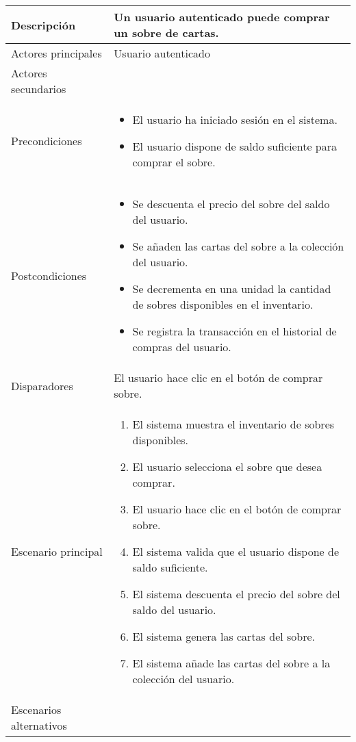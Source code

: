 \begin{longtable}{
    >{\columncolor{lightgreen!20}}p{4cm}
    p{12cm}
    }
    \midrule
    Descripción & Un usuario autenticado puede comprar un sobre de cartas. \\
    \midrule
    Actores principales & Usuario autenticado \\
    \midrule
    Actores secundarios &  \\
    \midrule
    Precondiciones & \begin{itemize}[nosep,leftmargin=*]
        \item El usuario ha iniciado sesión en el sistema.
        \item El usuario dispone de saldo suficiente para comprar el sobre.
    \end{itemize} \\
    \midrule
    Postcondiciones & \begin{itemize}[nosep,leftmargin=*]
        \item Se descuenta el precio del sobre del saldo del usuario.
        \item Se añaden las cartas del sobre a la colección del usuario.
        \item Se decrementa en una unidad la cantidad de sobres disponibles en el inventario.
        \item Se registra la transacción en el historial de compras del usuario.
    \end{itemize} \\
    \midrule
    Disparadores & El usuario hace clic en el botón de comprar sobre. \\
    \midrule
    Escenario principal & \begin{enumerate}[nosep,leftmargin=*]
        \item El sistema muestra el inventario de sobres disponibles.
        \item El usuario selecciona el sobre que desea comprar.
        \item El usuario hace clic en el botón de comprar sobre.
        \item El sistema valida que el usuario dispone de saldo suficiente.
        \item El sistema descuenta el precio del sobre del saldo del usuario.
        \item El sistema genera las cartas del sobre.
        \item El sistema añade las cartas del sobre a la colección del usuario.
    \end{enumerate} \\
    \midrule
    Escenarios alternativos & 
    \begin{itemize}[nosep,leftmargin=*]

\end{itemize}
\end{longtable}
